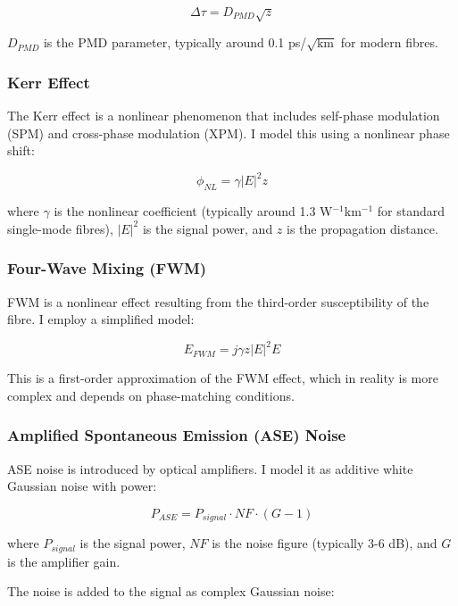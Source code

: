 \documentclass[journal]{IEEEtran}
\begin{document}
\begin{equation}
\Delta\tau = D_{PMD}\sqrt{z}
\end{equation}

$D_{PMD}$ is the PMD parameter, typically around 0.1 ps/$\sqrt{\text{km}}$ for modern fibres.

\subsubsection{Kerr Effect}
The Kerr effect is a nonlinear phenomenon that includes self-phase modulation (SPM) and cross-phase modulation (XPM). I model this using a nonlinear phase shift:

\begin{equation}
\phi_{NL} = \gamma |E|^2 z
\end{equation}

where $\gamma$ is the nonlinear coefficient (typically around 1.3 W$^{-1}$km$^{-1}$ for standard single-mode fibres), $|E|^2$ is the signal power, and $z$ is the propagation distance.

\subsubsection{Four-Wave Mixing (FWM)}
FWM is a nonlinear effect resulting from the third-order susceptibility of the fibre. I employ a simplified model:

\begin{equation}
E_{FWM} = j\gamma z |E|^2 E
\end{equation}

This is a first-order approximation of the FWM effect, which in reality is more complex and depends on phase-matching conditions.

\subsubsection{Amplified Spontaneous Emission (ASE) Noise}
ASE noise is introduced by optical amplifiers. I model it as additive white Gaussian noise with power:

\begin{equation}
P_{ASE} = P_{signal} \cdot NF \cdot (G - 1)
\end{equation}

where $P_{signal}$ is the signal power, $NF$ is the noise figure (typically 3-6 dB), and $G$ is the amplifier gain.

The noise is added to the signal as complex Gaussian noise:
\end{document}
